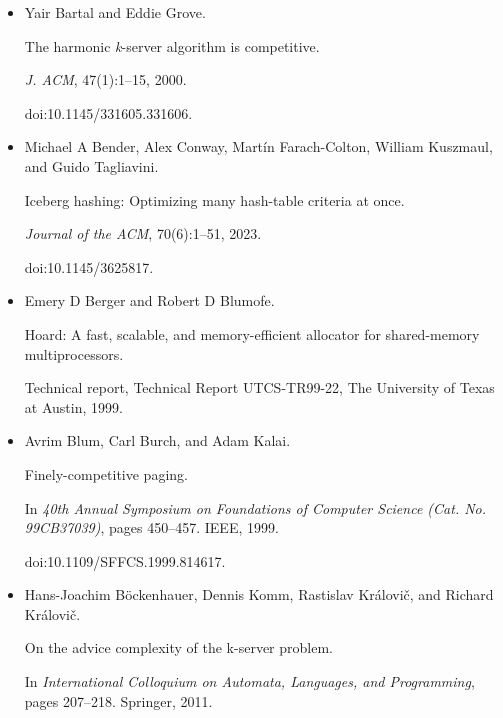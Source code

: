 \documentclass[10pt,a4paper]{article}
\begin{document}
\begin{itemize}
\item[] 
[6]

Yair Bartal and Eddie Grove.


The harmonic \emph{k}-server algorithm is competitive.


\emph{J. ACM}, 47(1):1–15, 2000.


doi:10.1145/331605.331606.





\item[] 
[7]

Michael A Bender, Alex Conway, Martín Farach-Colton, William Kuszmaul, and
Guido Tagliavini.


Iceberg hashing: Optimizing many hash-table criteria at once.


\emph{Journal of the ACM}, 70(6):1–51, 2023.


doi:10.1145/3625817.





\item[] 
[8]

Emery D Berger and Robert D Blumofe.


Hoard: A fast, scalable, and memory-efficient allocator for
shared-memory multiprocessors.


Technical report, Technical Report UTCS-TR99-22, The University of
Texas at Austin, 1999.





\item[] 
[9]

Avrim Blum, Carl Burch, and Adam Kalai.


Finely-competitive paging.


In \emph{40th Annual Symposium on Foundations of Computer Science
(Cat. No. 99CB37039)}, pages 450–457. IEEE, 1999.


doi:10.1109/SFFCS.1999.814617.





\item[] 
[10]

Hans-Joachim Böckenhauer, Dennis Komm, Rastislav Královič, and
Richard Královič.


On the advice complexity of the k-server problem.


In \emph{International Colloquium on Automata, Languages, and
Programming}, pages 207–218. Springer, 2011.






\end{itemize}
\end{document}
